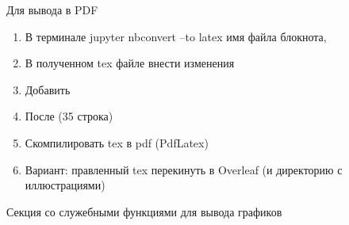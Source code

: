 \documentclass[11pt]{article}
\providecommand{\tightlist}{%
      \setlength{\itemsep}{0pt}\setlength{\parskip}{0pt}}
\begin{document}
    Для вывода в PDF

\begin{enumerate}
\def\labelenumi{\arabic{enumi}.}
\tightlist
\item
  В терминале jupyter nbconvert --to latex имя файла блокнота,
\item
  В полученном tex файле внести изменения
\item
  Добавить
\item
  После \ifPDFTeX (35 строка)

  \usepackage[T2A]{fontenc}
       \usepackage[english, russian]{babel}
\item
  Скомпилировать tex в pdf (PdfLatex)
\item
  Вариант: правленный tex перекинуть в Overleaf (и директорию с
  иллюстрациями)
\end{enumerate}

    Секция со служебными функциями для вывода графиков
\end{document}
